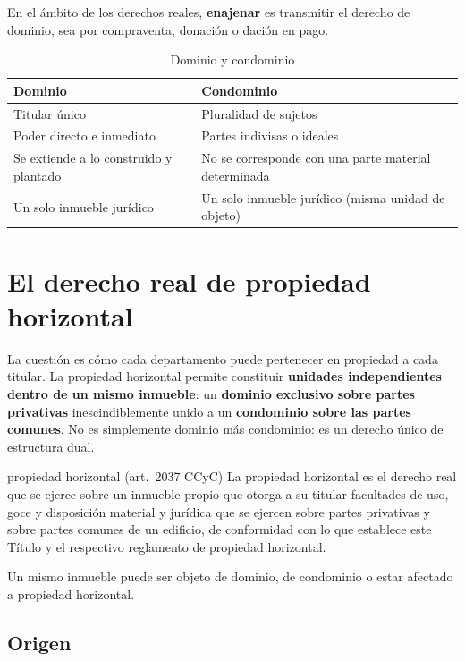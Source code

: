 \documentclass[12pt,oneside]{book}
\begin{document}
En el ámbito de los derechos reales, \textbf{enajenar} es transmitir el derecho de dominio, sea por compraventa, donación o dación en pago.

\begin{table}[H]
\centering
\small
\begin{tabularx}{\textwidth}{>{\raggedright\arraybackslash}X>{\raggedright\arraybackslash}X}
\toprule
\textbf{Dominio} & \textbf{Condominio} \\
\midrule
Titular único & Pluralidad de sujetos \\
Poder directo e inmediato & Partes indivisas o ideales \\
Se extiende a lo construido y plantado & No se corresponde con una parte material determinada \\
Un solo inmueble jurídico & Un solo inmueble jurídico (misma unidad de objeto) \\
\bottomrule
\end{tabularx}
\caption{Dominio y condominio}
\end{table}

\section{El derecho real de propiedad horizontal}

La cuestión es cómo cada departamento puede pertenecer en propiedad a cada titular. La propiedad horizontal permite constituir \textbf{unidades independientes dentro de un mismo inmueble}: un \textbf{dominio exclusivo sobre partes privativas} inescindiblemente unido a un \textbf{condominio sobre las partes comunes}. No es simplemente dominio más condominio: es un derecho único de estructura dual.

\begin{definicion}{propiedad horizontal (art.~2037 CCyC)}
La propiedad horizontal es el derecho real que se ejerce sobre un inmueble propio que otorga a su titular facultades de uso, goce y disposición material y jurídica que se ejercen sobre partes privativas y sobre partes comunes de un edificio, de conformidad con lo que establece este Título y el respectivo reglamento de propiedad horizontal.
\end{definicion}

Un mismo inmueble puede ser objeto de dominio, de condominio o estar afectado a propiedad horizontal.

\subsection{Origen}
\end{document}
